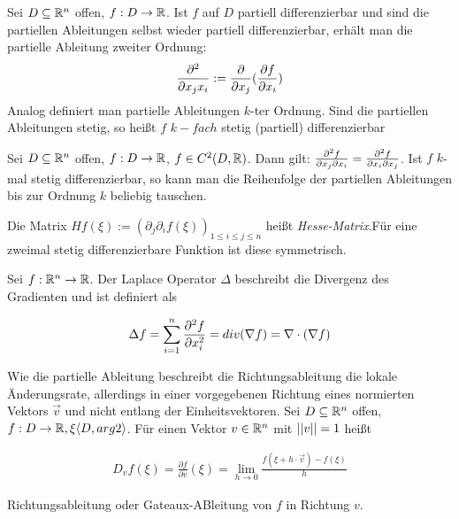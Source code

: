 \begin{definition}
	Sei $D \subseteq \mathbb{R}^n$ offen, $f : D \rightarrow \mathbb{R}$. Ist $f$ auf $D$ partiell differenzierbar und sind die partiellen Ableitungen selbst wieder partiell differenzierbar, erhält man die partielle Ableitung zweiter Ordnung: 
	\begin{align*}
		\frac{\partial ^2}{\partial x_j x_i} := \frac{\partial }{\partial x_j}(\frac{\partial f}{\partial x_i})
	\end{align*}
	Analog definiert man partielle Ableitungen $k$-ter Ordnung.  Sind die partiellen Ableitungen stetig, so heißt $f$ $k-fach$ stetig (partiell) differenzierbar
\end{definition}

\begin{satz}
	Sei $D \subseteq \mathbb{R}^n$ offen, $f : D \rightarrow \mathbb{R}$, $f \in C^{2}(D,\mathbb{R})$.  Dann gilt: $\frac{\partial ^2f}{\partial x_j \partial x_i} = \frac{\partial ^2f}{\partial x_i \partial x_j}$. Ist $f$ $k$-mal stetig differenzierbar, so kann man die Reihenfolge der partiellen Ableitungen bis zur Ordnung $k$ beliebig tauschen.
\end{satz}

\begin{definition}
	Die Matrix $Hf(\xi) := (\partial_j \partial_i f(\xi))_{1 \leq i \leq j \leq n}$ heißt \emph{Hesse-Matrix}.Für eine zweimal stetig differenzierbare Funktion ist diese symmetrisch. 
\end{definition}

\begin{definition}
	Sei $f : \mathbb{R}^n \rightarrow \mathbb{R}$. Der Laplace Operator $\Delta$ beschreibt die Divergenz des Gradienten und ist definiert als
	
	\begin{align*}
	\Delta f  = \sum_{i=1}^{n} \frac{\partial ^2f}{\partial x_i^2} = div(\nabla f) = \nabla \cdot (\nabla f)
	\end{align*}
\end{definition}


\begin{definition}[Richtungsableitung]
	Wie die partielle Ableitung beschreibt die Richtungsableitung die lokale Änderungsrate, allerdings in einer vorgegebenen Richtung eines normierten Vektors $\vec{v}$ und nicht entlang der Einheitsvektoren. Sei $D \subseteq \mathbb{R}^n$ offen, $f : D \rightarrow \mathbb{R}, \xi \langle  D, arg2 \rangle$. Für einen Vektor $v \in \mathbb{R}^n$ mit $||v|| = 1$ heißt
	
	\begin{align*}
	D_v f(\xi) = \frac{\partial f}{\partial v}(\xi) = \lim_{h \rightarrow 0} \frac{f(\xi  + h \cdot \vec{v}) - f(\xi)}{h}
	\end{align*}

	Richtungsableitung oder Gateaux-ABleitung von $f$ in Richtung $v$.
\end{definition}

